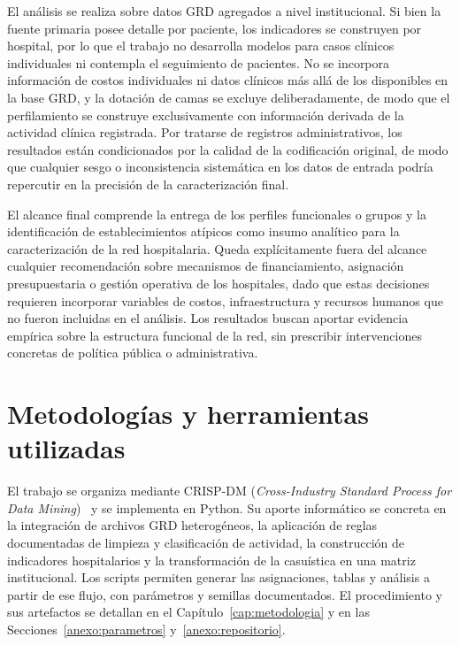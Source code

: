 El análisis se realiza sobre datos GRD agregados a nivel institucional. Si bien la
fuente primaria posee detalle por paciente, los indicadores se construyen por
hospital, por lo que el trabajo no desarrolla modelos para casos clínicos
individuales ni contempla el seguimiento de pacientes. No se incorpora
información de costos individuales ni datos clínicos más allá de los disponibles
en la base GRD, y la dotación de camas se excluye deliberadamente, de modo que el
perfilamiento se construye exclusivamente con información derivada de la actividad
clínica registrada. Por tratarse de registros administrativos, los resultados
están condicionados por la calidad de la codificación original, de modo que
cualquier sesgo o inconsistencia sistemática en los datos de entrada podría
repercutir en la precisión de la caracterización final.

El alcance final comprende la entrega de los perfiles funcionales o grupos y la
identificación de establecimientos atípicos como insumo analítico para la
caracterización de la red hospitalaria. Queda explícitamente fuera del alcance
cualquier recomendación sobre mecanismos de financiamiento, asignación
presupuestaria o gestión operativa de los hospitales, dado que estas decisiones
requieren incorporar variables de costos, infraestructura y recursos humanos que
no fueron incluidas en el análisis. Los resultados buscan aportar evidencia
empírica sobre la estructura funcional de la red, sin prescribir intervenciones
concretas de política pública o administrativa.


\section{Metodologías y herramientas utilizadas}
\label{sec:metodologias}

El trabajo se organiza mediante CRISP-DM
(\textit{Cross-Industry Standard Process for Data Mining})~\citep{Chapman2000}
y se implementa en Python. Su aporte informático se concreta en la integración
de archivos GRD heterogéneos, la aplicación de reglas documentadas de limpieza
y clasificación de actividad, la construcción de indicadores hospitalarios y
la transformación de la casuística en una matriz institucional. Los scripts
permiten generar las asignaciones, tablas y análisis a partir de ese flujo,
con parámetros y semillas documentados. El procedimiento y sus artefactos se
detallan en el Capítulo~\ref{cap:metodologia} y en las
Secciones~\ref{anexo:parametros} y~\ref{anexo:repositorio}.

